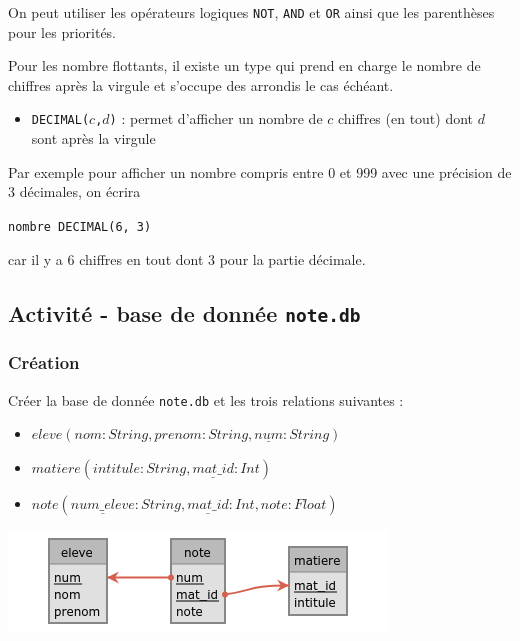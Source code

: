 \documentclass[a4paper,17pt]{extarticle}
\providecommand{\tightlist}{%
      \setlength{\itemsep}{0pt}\setlength{\parskip}{0pt}}
\begin{document}
On peut utiliser les opérateurs logiques \texttt{NOT}, \texttt{AND} et
\texttt{OR} ainsi que les parenthèses pour les priorités.

    Pour les nombre flottants, il existe un type qui prend en charge le
nombre de chiffres après la virgule et s'occupe des arrondis le cas
échéant.

\begin{itemize}
\tightlist
\item
  \texttt{DECIMAL(}\(c\)\texttt{,}\(d\)\texttt{)} : permet d'afficher un
  nombre de \(c\) chiffres (en tout) dont \(d\) sont après la virgule
\end{itemize}

    Par exemple pour afficher un nombre compris entre 0 et 999 avec une
précision de 3 décimales, on écrira

\texttt{nombre\ DECIMAL(6,\ 3)}

car il y a 6 chiffres en tout dont 3 pour la partie décimale.

    \hypertarget{activituxe9---base-de-donnuxe9e-note.db}{%
\subsection{\texorpdfstring{Activité - base de donnée
\texttt{note.db}}{Activité - base de donnée note.db}}\label{activituxe9---base-de-donnuxe9e-note.db}}

    \hypertarget{cruxe9ation}{%
\subsubsection{Création}\label{cruxe9ation}}

Créer la base de donnée \texttt{note.db} et les trois relations
suivantes :

\begin{itemize}
\tightlist
\item
  \(eleve(nom: String, prenom: String, \underline{num}: String)\)
\item
  \(matiere(intitule: String, \underline{mat\_id}: Int)\)
\item
  \(note(\underline{num\_eleve}: String, \underline{mat\_id}: Int, note: Float)\)
\end{itemize}

    \includegraphics{./img-ex_note.png}
\end{document}

